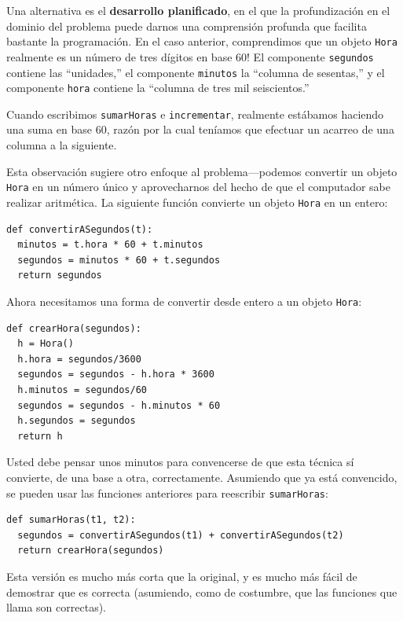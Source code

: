 Una alternativa es el {\bf desarrollo planificado}, en 
el que la profundización en el dominio del problema puede
darnos una comprensión profunda que facilita bastante la 
programación. En el caso anterior, comprendimos que 
un objeto  \texttt{Hora} realmente es un número de
tres dígitos en base 60!  El componente \texttt{segundos} 
contiene las  ``unidades,'' el componente
\texttt{minutos} la  ``columna de sesentas,'' y 
el componente \texttt{hora} contiene la ``columna de tres mil 
seiscientos.''

Cuando escribimos  \texttt{sumarHoras} e \texttt{incrementar}, 
realmente estábamos haciendo una suma en base 60, razón 
por la cual teníamos que efectuar un acarreo de una columna
a la siguiente.

Esta observación sugiere otro enfoque al problema---podemos
convertir un objeto  \texttt{Hora} en un número único 
y aprovecharnos del hecho de que el computador sabe
realizar aritmética.  La siguiente función convierte
un objeto  \texttt{Hora} en un entero:

\beforeverb
\begin{verbatim}
def convertirASegundos(t):
  minutos = t.hora * 60 + t.minutos
  segundos = minutos * 60 + t.segundos
  return segundos
\end{verbatim}
\afterverb
%
Ahora necesitamos una forma de convertir desde entero
a un objeto  \texttt{Hora}:


\beforeverb
\begin{verbatim}
def crearHora(segundos):
  h = Hora()
  h.hora = segundos/3600
  segundos = segundos - h.hora * 3600
  h.minutos = segundos/60
  segundos = segundos - h.minutos * 60
  h.segundos = segundos
  return h
\end{verbatim}
\afterverb
%
Usted debe pensar unos minutos para convencerse de que
esta técnica sí convierte, de una base a otra, correctamente.
Asumiendo que ya está convencido, se pueden usar las 
funciones anteriores para reescribir {\tt sumarHoras}:

\beforeverb
\begin{verbatim}
def sumarHoras(t1, t2):
  segundos = convertirASegundos(t1) + convertirASegundos(t2)
  return crearHora(segundos)
\end{verbatim}
\afterverb
%
Esta versión es mucho más corta que la original, y es mucho
más fácil de demostrar que es correcta (asumiendo, como de 
costumbre, que las funciones que llama son correctas).



